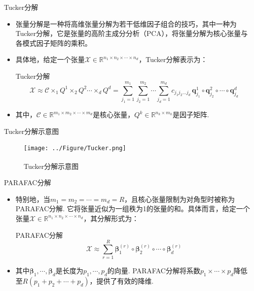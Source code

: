 \documentclass{beamer}
\newcommand{\supcite}[1]{\textsuperscript{\cite{#1}}}
\begin{document}
	\begin{frame}{Tucker分解}
		\begin{itemize}[<+->]
			\item 张量分解是一种将高维张量分解为若干低维因子组合的技巧，其中一种为Tucker分解，它是张量的高阶主成分分析（PCA），将张量分解为核心张量与各模式因子矩阵的乘积。
			\item 具体地，给定一个张量$\mathcal{X} \in \mathbb{R}^{n_1 \times n_2 \times \cdots \times n_d}$，Tucker分解表示为：
			\begin{exampleblock}{Tucker分解}
				\begin{equation}
					\mathcal{X} \approx \mathcal{C} \times_1 Q^1 \times_2 Q^2 \cdots \times_d Q^d = \sum_{j_1=1}^{m_1} \sum_{j_2=1}^{m_2} \cdots \sum_{j_d=1}^{m_d} c_{j_1 j_2 \dots j_d} 
					\, \mathbf{q}^{1}_{j_1} \circ \mathbf{q}^{2}_{j_2} \circ \cdots \circ \mathbf{q}^{d}_{j_d} \label{Equation:Tucker}
				\end{equation}
			\end{exampleblock}
			\item 其中，$\mathcal{C}\in \mathbb{R}^{m_1 \times m_2 \times \cdots \times m_d}$是核心张量，$Q^{k} \in \mathbb{R}^{n_k \times m_k}$是因子矩阵.
		\end{itemize}
	\end{frame}
	
	\begin{frame}{Tucker分解示意图}
		\begin{figure}
			\texttt{[image: ../Figure/Tucker.png]}
			\caption{Tucker分解示意图\supcite{a}}
		\end{figure}
	\end{frame}
	
	\begin{frame}{PARAFAC分解}
		\begin{itemize}[<+->]
			\item 特别地，当$m_{1} =m_{2} = \cdots =m_{d} = R$，且核心张量限制为对角型时被称为PARAFAC分解. 它将张量近似为一组秩为1的张量的和。具体而言，给定一个张量$\mathcal{X} \in \mathbb{R}^{n_1 \times n_2 \times \cdots \times n_d}$，其分解形式为：
			\begin{exampleblock}{PARAFAC分解}
				\begin{equation}
					\mathcal{X} \approx \sum_{r=1}^{R} \bm{\beta}_1^{(r)} \circ \bm{\beta}_2^{(r)} \circ \cdots \circ \bm{\beta}_d^{(r)}
				\end{equation}
			\end{exampleblock}
			\item 其中$\bm{\beta}_{1},\cdots,\bm{\beta}_{d}$是长度为$p_{1},\cdots,p_{d}$的向量. PARAFAC分解将系数$p_{1}\times\cdots\times p_{d}$降低至$R(p_{1} + p_{2} +\cdots +p_{d})$，提供了有效的降维.
		\end{itemize}
	\end{frame}
	
\end{document}
